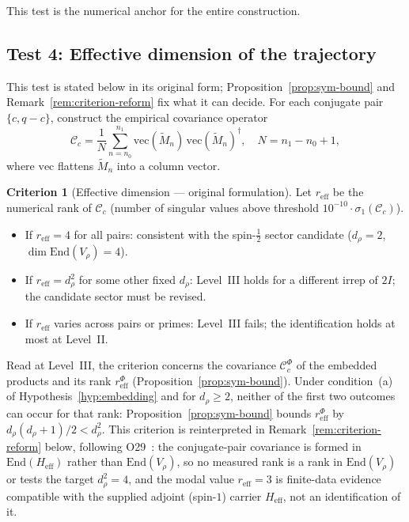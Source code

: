 \documentclass[12pt,a4paper]{article}
\theoremstyle{definition}
\newtheorem{criterion}[theorem]{Criterion}
\theoremstyle{remark}
\begin{document}
    This test is the numerical anchor for the entire construction.

  \subsection{Test 4: Effective dimension of the trajectory}
    \label{sec:test4}

    This test is stated below in its original form; Proposition~\ref{prop:sym-bound} and
    Remark~\ref{rem:criterion-reform} fix what it can decide.
    For each conjugate pair $\{c, q-c\}$, construct the empirical covariance operator
    \begin{equation}
      \mathcal{C}_c = \frac{1}{N} \sum_{n=n_0}^{n_1}
      \mathrm{vec}(\widetilde{M}_n)\,\mathrm{vec}(\widetilde{M}_n)^\dagger,
      \quad N = n_1 - n_0 + 1,
      \label{eq:covariance}
    \end{equation}
    where $\mathrm{vec}$ flattens $\widetilde{M}_n$ into a column vector.

    \begin{criterion}[Effective dimension --- original formulation]
  Let $r_{\mathrm{eff}}$ be the numerical rank of $\mathcal{C}_c$
  (number of singular values above threshold
  $10^{-10} \cdot \sigma_1(\mathcal{C}_c)$).
  \begin{itemize}
    \item If $r_{\mathrm{eff}} = 4$ for all pairs: consistent with the
    spin-$\frac{1}{2}$ sector candidate ($d_\rho = 2$,
    $\dim\mathrm{End}(V_\rho) = 4$).
    \item If $r_{\mathrm{eff}} = d_\rho^2$ for some other fixed $d_\rho$:
    Level~III holds for a different irrep of $2I$; the candidate sector
    must be revised.
    \item If $r_{\mathrm{eff}}$ varies across pairs or primes: Level~III fails;
    the identification holds at most at Level~II.
  \end{itemize}
  Read at Level~III, the criterion concerns the covariance $\mathcal{C}^{\Phi}_c$ of the embedded products
  and its rank $r^{\Phi}_{\mathrm{eff}}$ (Proposition~\ref{prop:sym-bound}).
  Under condition~(a) of Hypothesis~\ref{hyp:embedding} and for $d_\rho \geq 2$, neither of the first two
  outcomes can occur for that rank: Proposition~\ref{prop:sym-bound} bounds $r^{\Phi}_{\mathrm{eff}}$ by
  $d_\rho(d_\rho+1)/2 < d_\rho^2$.
  This criterion is reinterpreted in Remark~\ref{rem:criterion-reform} below,
  following O29~\cite{Beau2026a33}: the conjugate-pair covariance is formed in $\mathrm{End}(H_{\mathrm{eff}})$
  rather than $\mathrm{End}(V_\rho)$, so no measured rank is a rank in $\mathrm{End}(V_\rho)$ or tests the
  target $d_\rho^2 = 4$, and the modal value
  $r_{\mathrm{eff}} = 3$ is finite-data evidence compatible with the supplied adjoint (spin-$1$) carrier
  $H_{\mathrm{eff}}$, not an identification of it.
    \end{criterion}
\end{document}
